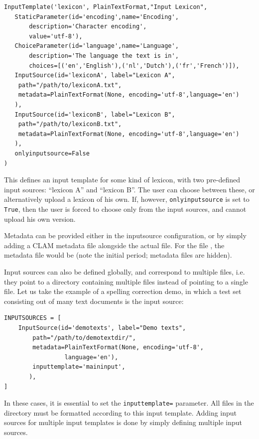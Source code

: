 \documentclass[a4paper,12pt,twoside,openright]{report}
\begin{document}
{ \small
\begin{verbatim}
InputTemplate('lexicon', PlainTextFormat,"Input Lexicon", 
   StaticParameter(id='encoding',name='Encoding',
       description='Character encoding',
       value='utf-8'),
   ChoiceParameter(id='language',name='Language',
       description='The language the text is in', 
       choices=[('en','English'),('nl','Dutch'),('fr','French')]),
   InputSource(id='lexiconA', label="Lexicon A",
    path="/path/to/lexiconA.txt", 
    metadata=PlainTextFormat(None, encoding='utf-8',language='en')
   ),
   InputSource(id='lexiconB', label="Lexicon B",
    path="/path/to/lexiconB.txt", 
    metadata=PlainTextFormat(None, encoding='utf-8',language='en')
   ),
   onlyinputsource=False
)            
\end{verbatim}
}

This defines an input template for some kind of lexicon, with two pre-defined
input sources: ``lexicon A'' and ``lexicon B''. The user can choose between
these, or alternatively upload a lexicon of his own. If, however,
\texttt{onlyinputsource} is set to \texttt{True}, then the user is forced to
choose only from the input sources, and cannot upload his own version. 

Metadata can be provided either in the inputsource configuration, or by simply
adding a CLAM metadata file alongside the actual file. For the file
, the metadata file would be
 (note the initial period; metadata
files are hidden). 

Input sources can also be defined globally, and correspond to multiple files,
i.e. they point to a directory containing multiple files instead of pointing to
a single file. Let us take the example of a spelling correction demo, in which
a test set consisting out of many text documents is the input source:

{ \small
\begin{verbatim}
INPUTSOURCES = [
    InputSource(id='demotexts', label="Demo texts",
        path="/path/to/demotextdir/", 
        metadata=PlainTextFormat(None, encoding='utf-8',
                 language='en'),
        inputtemplate='maininput',
       ),
]
\end{verbatim}
}

In these cases, it is essential to set the \texttt{inputtemplate=} parameter.
All files in the directory must be formatted according to this input template.
Adding input sources for multiple input templates is done by simply defining
multiple input sources. %
\end{document}
